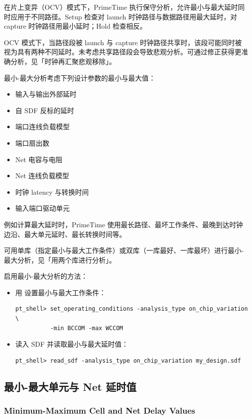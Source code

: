 在片上变异（OCV）模式下，PrimeTime 执行保守分析，允许最小与最大延时同时应用于不同路径。Setup 检查对 launch 时钟路径与数据路径用最大延时，对 capture 时钟路径用最小延时；Hold 检查相反。

OCV 模式下，当路径段被 launch 与 capture 时钟路径共享时，该段可能同时被视为具有两种不同延时。未考虑共享路径段会导致悲观分析。可通过修正获得更准确分析，见「时钟再汇聚悲观移除」。

最小-最大分析考虑下列设计参数的最小与最大值：
\begin{itemize}
  \item 输入与输出外部延时
  \item 自 SDF 反标的延时
  \item 端口连线负载模型
  \item 端口扇出数
  \item Net 电容与电阻
  \item Net 连线负载模型
  \item 时钟 latency 与转换时间
  \item 输入端口驱动单元
\end{itemize}

例如计算最大延时时，PrimeTime 使用最长路径、最坏工作条件、最晚到达时钟边沿、最大单元延时、最长转换时间等。

可用单库（指定最小与最大工作条件）或双库（一库最好、一库最坏）进行最小-最大分析，见「用两个库进行分析」。

启用最小-最大分析的方法：
\begin{itemize}
  \item 用  设置最小与最大工作条件：
\begin{lstlisting}
pt_shell> set_operating_conditions -analysis_type on_chip_variation \
          -min BCCOM -max WCCOM
\end{lstlisting}
  \item 读入 SDF 并读取最小与最大延时值：
\begin{lstlisting}
pt_shell> read_sdf -analysis_type on_chip_variation my_design.sdf
\end{lstlisting}
\end{itemize}

\subsection{最小-最大单元与 Net 延时值}
\subsubsection*{Minimum-Maximum Cell and Net Delay Values}

